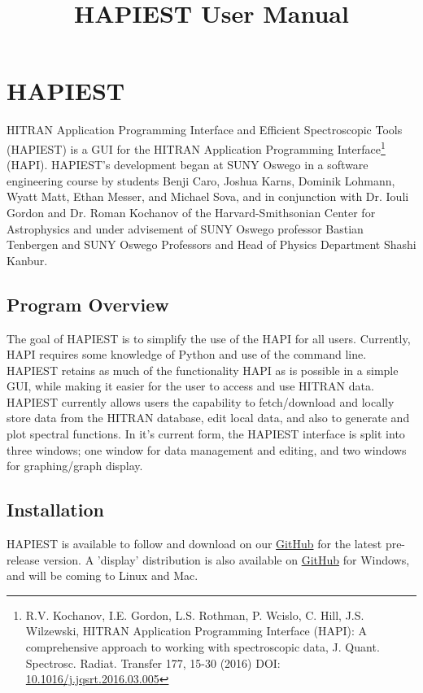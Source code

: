\documentclass[12pt]{article}
\begin{document}
\title{HAPIEST User Manual} 
\date{}
\maketitle
\thispagestyle{empty}
\newpage
\tableofcontents
\thispagestyle{empty}
\newpage
\setcounter{page}{1}

\section{HAPIEST}
HITRAN Application Programming Interface and Efficient Spectroscopic Tools (HAPIEST) is a GUI for the HITRAN Application Programming Interface\footnote{R.V. Kochanov, I.E. Gordon, L.S. Rothman, P. Wcislo, C. Hill, J.S. Wilzewski, HITRAN Application Programming Interface (HAPI): A comprehensive approach to working with spectroscopic data, J. Quant. Spectrosc. Radiat. Transfer 177, 15-30 (2016) DOI: \href{https://doi.org/10.1016/j.jqsrt.2016.03.005}{10.1016/j.jqsrt.2016.03.005} } (HAPI). HAPIEST's development began at SUNY Oswego in a software engineering course by students Benji Caro, Joshua Karns, Dominik Lohmann, Wyatt Matt, Ethan Messer, and Michael Sova, and in conjunction with Dr. Iouli Gordon and Dr. Roman Kochanov of the Harvard-Smithsonian Center for Astrophysics and under advisement of SUNY Oswego professor Bastian Tenbergen and SUNY Oswego Professors and Head of Physics Department Shashi Kanbur.

\subsection{Program Overview}
The goal of HAPIEST is to simplify the use of the HAPI for all users. Currently, HAPI requires some knowledge of Python and use of the command line. HAPIEST retains as much of the functionality HAPI as is possible in a simple GUI, while making it easier for the user to access and use HITRAN data. HAPIEST currently allows users the capability to fetch/download and locally store data from the HITRAN database, edit local data, and also to generate and plot spectral functions. In it's current form, the HAPIEST interface is split into three windows; one window for data management and editing, and two windows for graphing/graph display.

\subsection{Installation}
HAPIEST is available to follow and download on our \href{https://github.com/hitranonline/hapiest}{GitHub} for the latest pre-release version. A 'display' distribution is also available on \href{https://github.com/hitranonline/hapiest/releases}{GitHub} for Windows, and will be coming to Linux and Mac.
\end{document}

